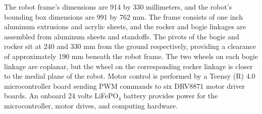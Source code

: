 \documentclass[lettersize,journal]{IEEEtran}
\theoremstyle{definition}
\begin{document}
The robot frame's dimensions are 914 by 330 millimeters, and the robot's bounding box dimensions are 991 by 762 mm. The frame consists of one inch aluminum extrusions and acrylic sheets, and the rocker and bogie linkages are assembled from aluminum sheets and standoffs. The pivots of the bogie and rocker sit at 240 and 330 mm from the ground respectively, providing a clearance of approximately 190 mm beneath the robot frame. The two wheels on each bogie linkage are coplanar, but the wheel on the corresponding rocker linkage is closer to the medial plane of the robot. Motor control is performed by a Teensy (R) 4.0 microcontroller board sending PWM commands to six DRV8871 motor driver boards. An onboard 24 volts LiFePO${}_\text{4}$ battery provides power for the microcontroller, motor drives, and computing hardware.
\end{document}
